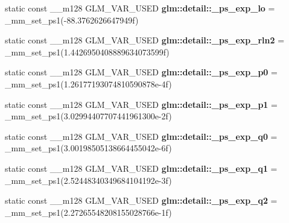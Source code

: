 \begin{DoxyCompactItemize}
\item 
\hypertarget{namespaceglm_1_1detail_af469973e4367b59d207d6c965da897be}{}static const \+\_\+\+\_\+m128 G\+L\+M\+\_\+\+V\+A\+R\+\_\+\+U\+S\+E\+D {\bfseries glm\+::detail\+::\+\_\+ps\+\_\+exp\+\_\+lo} = \+\_\+mm\+\_\+set\+\_\+ps1(-\/88.\+3762626647949f)\label{namespaceglm_1_1detail_af469973e4367b59d207d6c965da897be}

\item 
\hypertarget{namespaceglm_1_1detail_a2355abd0d81bb5cc704bfcc14cc1cdbd}{}static const \+\_\+\+\_\+m128 G\+L\+M\+\_\+\+V\+A\+R\+\_\+\+U\+S\+E\+D {\bfseries glm\+::detail\+::\+\_\+ps\+\_\+exp\+\_\+rln2} = \+\_\+mm\+\_\+set\+\_\+ps1(1.\+4426950408889634073599f)\label{namespaceglm_1_1detail_a2355abd0d81bb5cc704bfcc14cc1cdbd}

\item 
\hypertarget{namespaceglm_1_1detail_a10ff1f8ccb3f3513a40aee5e9e7314a9}{}static const \+\_\+\+\_\+m128 G\+L\+M\+\_\+\+V\+A\+R\+\_\+\+U\+S\+E\+D {\bfseries glm\+::detail\+::\+\_\+ps\+\_\+exp\+\_\+p0} = \+\_\+mm\+\_\+set\+\_\+ps1(1.\+26177193074810590878e-\/4f)\label{namespaceglm_1_1detail_a10ff1f8ccb3f3513a40aee5e9e7314a9}

\item 
\hypertarget{namespaceglm_1_1detail_a96886f6561d43526f2c56ebbaf3408f0}{}static const \+\_\+\+\_\+m128 G\+L\+M\+\_\+\+V\+A\+R\+\_\+\+U\+S\+E\+D {\bfseries glm\+::detail\+::\+\_\+ps\+\_\+exp\+\_\+p1} = \+\_\+mm\+\_\+set\+\_\+ps1(3.\+02994407707441961300e-\/2f)\label{namespaceglm_1_1detail_a96886f6561d43526f2c56ebbaf3408f0}

\item 
\hypertarget{namespaceglm_1_1detail_a7865e2d5a04b9b092e50f68db87bb273}{}static const \+\_\+\+\_\+m128 G\+L\+M\+\_\+\+V\+A\+R\+\_\+\+U\+S\+E\+D {\bfseries glm\+::detail\+::\+\_\+ps\+\_\+exp\+\_\+q0} = \+\_\+mm\+\_\+set\+\_\+ps1(3.\+00198505138664455042e-\/6f)\label{namespaceglm_1_1detail_a7865e2d5a04b9b092e50f68db87bb273}

\item 
\hypertarget{namespaceglm_1_1detail_a0d5e2dc9f62936208198de9d300e9c29}{}static const \+\_\+\+\_\+m128 G\+L\+M\+\_\+\+V\+A\+R\+\_\+\+U\+S\+E\+D {\bfseries glm\+::detail\+::\+\_\+ps\+\_\+exp\+\_\+q1} = \+\_\+mm\+\_\+set\+\_\+ps1(2.\+52448340349684104192e-\/3f)\label{namespaceglm_1_1detail_a0d5e2dc9f62936208198de9d300e9c29}

\item 
\hypertarget{namespaceglm_1_1detail_a927e13574f51f28b517cc0cf30f5d9ec}{}static const \+\_\+\+\_\+m128 G\+L\+M\+\_\+\+V\+A\+R\+\_\+\+U\+S\+E\+D {\bfseries glm\+::detail\+::\+\_\+ps\+\_\+exp\+\_\+q2} = \+\_\+mm\+\_\+set\+\_\+ps1(2.\+27265548208155028766e-\/1f)\label{namespaceglm_1_1detail_a927e13574f51f28b517cc0cf30f5d9ec}


\end{DoxyCompactItemize}
